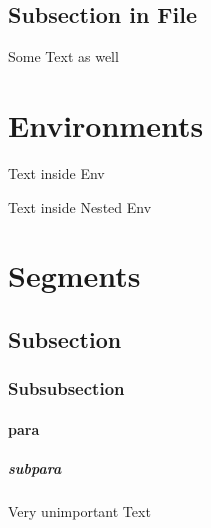 \subsection{Subsection in File}
Some Text as well

\section{Environments}
\begin{Some_Env}
Text inside Env

\begin{Nested_Env}
Text inside Nested Env

\end{Nested_Env}
\end{Some_Env}
\section{Segments}
\subsection{Subsection}
\subsubsection{Subsubsection}
\paragraph{para}
\subparagraph{subpara}
Very unimportant Text



